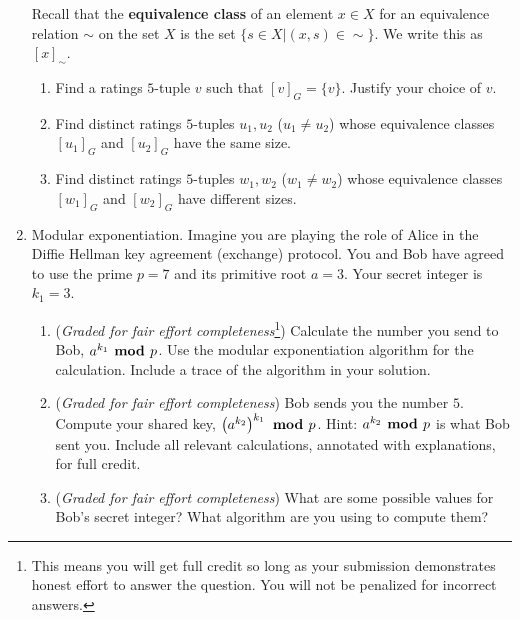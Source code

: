 \begin{enumerate}[labelindent=0pt, leftmargin=0pt]
    Recall that the {\bf equivalence class} of an element $x \in X$ for an equivalence relation $\sim$ on the set $X$ 
    is the set $\{s \in X | (x, s) \in \sim \}$. We write this as $[x]_\sim$.
    
    \begin{enumerate}
        \item\gradeCorrect Find a ratings $5$-tuple $v$ such that $[v]_{G} = \{v \}$. Justify your choice of $v$.
        \item\gradeComplete Find distinct ratings $5$-tuples $u_1, u_2$ ($u_1 \neq u_2$) whose equivalence classes $[u_1]_{G}$ and $[u_2]_{G}$ have the same size.
        \item\gradeComplete Find distinct ratings $5$-tuples $w_1, w_2$ ($w_1 \neq w_2$) whose equivalence classes $[w_1]_{G}$ and $[w_2]_{G}$ have different sizes.
    \end{enumerate}


    \item Modular exponentiation.
    Imagine you are playing the role of Alice in the Diffie Hellman key agreement (exchange) protocol.  
    You and Bob have agreed to use the prime $p = 7$ and its primitive root $a = 3$.
    Your secret integer is $k_1 = 3$.
        
        \begin{enumerate}
        \item  ({\it Graded for fair effort completeness}\footnote{This means 
        you will get full credit so long as your submission demonstrates honest 
        effort to answer the question. You will not be penalized for incorrect answers.}) 
        Calculate the number you send to Bob, 
        $a^{k_1} \textrm{\bf ~mod~} p$.  Use the modular exponentiation algorithm
        for the calculation. Include a trace of the algorithm in your solution.

        
        
        \item  ({\it Graded for fair effort completeness}) Bob sends you the number $5$. Compute  your shared key, $\left(a^{k_2}\right)^{k_1}  
        \textrm{\bf ~mod~} p$.
        Hint: $a^{k_2} \textrm{\bf ~mod~} p$ is what Bob sent you.  Include all relevant calculations, annotated with explanations, 
        for full credit.
        
        
        \item ({\it Graded for fair effort completeness}) What are some possible values for Bob's secret integer?  What 
        algorithm are you using to compute them?
        \end{enumerate}


    \end{enumerate}

